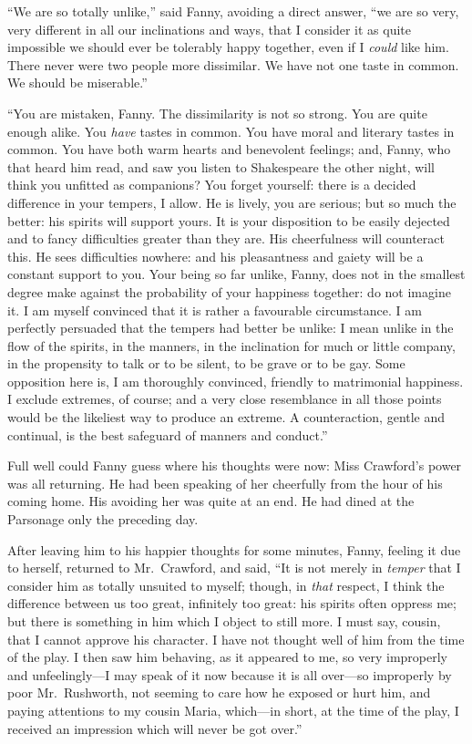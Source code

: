 \documentclass{article}
\begin{document}
``We are so totally unlike,'' said Fanny, avoiding a
direct answer, ``we are so very, very different in all
our inclinations and ways, that I consider it as quite
impossible we should ever be tolerably happy together,
even if I \emph{could} like him.  There never were two people
more dissimilar.  We have not one taste in common.
We should be miserable.''

``You are mistaken, Fanny.  The dissimilarity is not so strong.
You are quite enough alike.  You \emph{have} tastes in common.
You have moral and literary tastes in common.  You have
both warm hearts and benevolent feelings; and, Fanny,
who that heard him read, and saw you listen to Shakespeare
the other night, will think you unfitted as companions?
You forget yourself:  there is a decided difference
in your tempers, I allow.  He is lively, you are serious;
but so much the better:  his spirits will support yours.
It is your disposition to be easily dejected and to fancy
difficulties greater than they are.  His cheerfulness
will counteract this.  He sees difficulties nowhere:
and his pleasantness and gaiety will be a constant support
to you.  Your being so far unlike, Fanny, does not in
the smallest degree make against the probability of your
happiness together:  do not imagine it.  I am myself
convinced that it is rather a favourable circumstance.
I am perfectly persuaded that the tempers had better be unlike:
I mean unlike in the flow of the spirits, in the manners,
in the inclination for much or little company, in the
propensity to talk or to be silent, to be grave or to be gay.
Some opposition here is, I am thoroughly convinced,
friendly to matrimonial happiness.  I exclude extremes,
of course; and a very close resemblance in all those
points would be the likeliest way to produce an extreme.
A counteraction, gentle and continual, is the best safeguard
of manners and conduct.''

Full well could Fanny guess where his thoughts were now:
Miss Crawford's power was all returning.  He had been
speaking of her cheerfully from the hour of his coming home.
His avoiding her was quite at an end.  He had dined at the
Parsonage only the preceding day.

After leaving him to his happier thoughts for some minutes,
Fanny, feeling it due to herself, returned to Mr.\ Crawford,
and said, ``It is not merely in \emph{temper} that I consider
him as totally unsuited to myself; though, in \emph{that}
respect, I think the difference between us too great,
infinitely too great:  his spirits often oppress me;
but there is something in him which I object to still more.
I must say, cousin, that I cannot approve his character.
I have not thought well of him from the time of the play.
I then saw him behaving, as it appeared to me, so very
improperly and unfeelingly---I may speak of it now because
it is all over---so improperly by poor Mr.\ Rushworth,
not seeming to care how he exposed or hurt him,
and paying attentions to my cousin Maria, which---in short,
at the time of the play, I received an impression which
will never be got over.''
\end{document}
